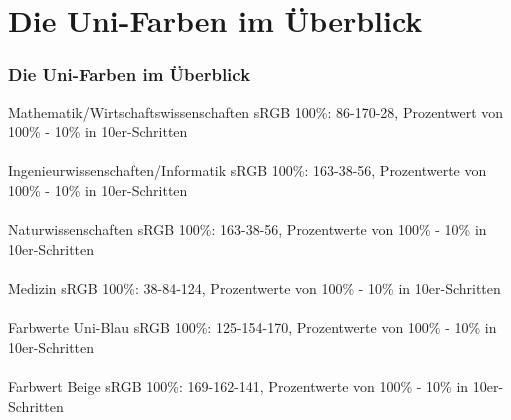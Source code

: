 \documentclass{beamer}
\begin{document}
\section{Die Uni-Farben im \"{U}berblick}
\begin{frame}
 \frametitle{Die Uni-Farben im \"{U}berblick}
 \vspace{-0.1cm}
\hspace{-0.75cm}  \tiny{Mathematik/Wirtschaftswissenschaften sRGB 100\%: 86-170-28, Prozentwert von 100\% - 10\% in 10er-Schritten} \\
\hspace{-0.7cm}  \colorbox{farbwert-mawi}{}{} \\
 \vspace{0.5cm}
\hspace{-0.7cm}  \tiny{Ingenieurwissenschaften/Informatik sRGB 100\%: 163-38-56, Prozentwerte von 100\% - 10\% in 10er-Schritten} \\
\hspace{-0.7cm}  \colorbox{farbwert-inwiin}{}{} \\
  \vspace{0.5cm}
\hspace{-0.7cm}  \tiny{Naturwissenschaften sRGB 100\%: 163-38-56, Prozentwerte von 100\% - 10\% in 10er-Schritten} \\
\hspace{-0.7cm}  \colorbox{farbwert-nawi}{}{} \\
   \vspace{0.5cm}
   \hspace{-0.7cm}  \tiny{Medizin sRGB 100\%: 38-84-124, Prozentwerte von 100\% - 10\% in 	       10er-Schritten} \\
\hspace{-0.7cm}  \colorbox{farbwert-med-blau}{}{}  \\
  \vspace{0.5cm}
\hspace{-0.7cm}  \tiny{Farbwerte Uni-Blau sRGB 100\%: 125-154-170, Prozentwerte von 100\% - 10\% in 	       10er-Schritten} \\
\hspace{-0.7cm}  \colorbox{farbwert-blau}{}{}  \\
  \vspace{0.5cm}
  \hspace{-0.7cm}  \tiny{Farbwert Beige sRGB 100\%: 169-162-141, Prozentwerte von 100\% - 10\% in 10er-Schritten} \\
\hspace{-0.7cm}  \colorbox{farbwert-beige}{}{} \\
  \vspace{0.5cm}
\end{frame}
\end{document}
